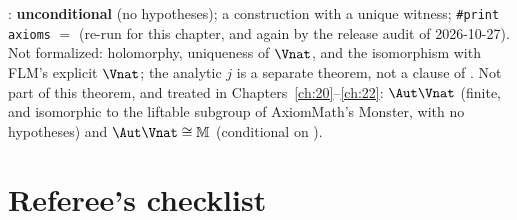 \begin{status}
: \textbf{unconditional} (no hypotheses); a construction with a unique
witness; \texttt{\#print axioms} $=$
 (re-run for this chapter, and again by the release audit of
2026-10-27).  Not formalized: holomorphy, uniqueness of $\Vnat$, and the isomorphism with FLM's explicit $\Vnat$;
the analytic $j$ is a separate theorem, not a clause of .  Not part of this theorem, and treated in
Chapters~\ref{ch:20}--\ref{ch:22}: $\Aut\Vnat$ (finite, and isomorphic to the liftable subgroup of AxiomMath's Monster,
with no hypotheses) and $\Aut\Vnat\cong\mathbb M$ (conditional on ).
\end{status}

\section{Referee's checklist}\label{ch14:sec:checklist}

